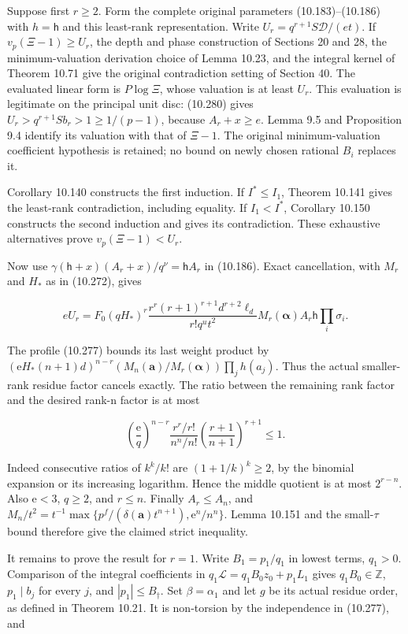 \documentclass[
  11pt,
  a4paper,
]{article}
\begin{document}
Suppose first \(r\ge2\). Form the complete original parameters
(10.183)--(10.186) with \(h=\mathsf h\) and this least-rank
representation. Write \(U_r=q^{r+1}S\mathcal D/(et)\). If
\(v_p(\Xi-1)\ge U_r\), the depth and phase construction of Sections 20
and 28, the minimum-valuation derivation choice of Lemma 10.23, and the
integral kernel of Theorem 10.71 give the original contradiction setting
of Section 40. The evaluated linear form is \(P\log\Xi\), whose
valuation is at least \(U_r\). This evaluation is legitimate on the
principal unit disc: (10.280) gives \(U_r>q^{r+1}Sb_r>1\ge1/(p-1)\),
because \(A_r+x\ge e\). Lemma 9.5 and Proposition 9.4 identify its
valuation with that of \(\Xi-1\). The original minimum-valuation
coefficient hypothesis is retained; no bound on newly chosen rational
\(B_i\) replaces it.

Corollary 10.140 constructs the first induction. If \(I^*\le I_1\),
Theorem 10.141 gives the least-rank contradiction, including equality.
If \(I_1<I^*\), Corollary 10.150 constructs the second induction and
gives its contradiction. These exhaustive alternatives prove
\(v_p(\Xi-1)<U_r\).

Now use \(\gamma(\mathsf h+x)(A_r+x)/q^\nu
=\mathsf hA_r\) in (10.186). Exact cancellation, with \(M_r\) and
\(H_*\) as in (10.272), gives

\[
eU_r=F_0(qH_*)^r
\frac{r^r(r+1)^{r+1}d^{r+2}\ell_d}{r!q^ut^2}
M_r(\boldsymbol\alpha)A_r\mathsf h\prod_i\sigma_i.
\tag{10.452}
\]

The profile (10.277) bounds its last weight product by
\((\mathrm eH_*(n+1)d)^{n-r}
(M_n(\boldsymbol a)/M_r(\boldsymbol\alpha))\prod_jh(a_j)\). Thus the
actual smaller-rank residue factor cancels exactly. The ratio between
the remaining rank factor and the desired rank-n factor is at most

\[
\left(\frac{\mathrm e}{q}\right)^{n-r}
\frac{r^r/r!}{n^n/n!}
\left(\frac{r+1}{n+1}\right)^{r+1}\le1.
\tag{10.453}
\]

Indeed consecutive ratios of \(k^k/k!\) are \((1+1/k)^k\ge2\), by the
binomial expansion or its increasing logarithm. Hence the middle
quotient is at most \(2^{r-n}\). Also \(\mathrm e<3\), \(q\ge2\), and
\(r\le n\). Finally \(A_r\le A_n\), and
\(M_n/t^2=t^{-1}\max\{p^f/(\delta(\boldsymbol a)t^{n+1}),
\mathrm e^n/n^n\}\). Lemma 10.151 and the small-\(\tau\) bound therefore
give the claimed strict inequality.

It remains to prove the result for \(r=1\). Write \(B_1=p_1/q_1\) in
lowest terms, \(q_1>0\). Comparison of the integral coefficients in
\(q_1\mathcal L=q_1B_0z_0+p_1L_1\) gives \(q_1B_0\in\mathbb Z\),
\(p_1\mid b_j\) for every \(j\), and \(|p_1|\le B_\dagger\). Set
\(\beta=\alpha_1\) and let \(g\) be its actual residue order, as defined
in Theorem 10.21. It is non-torsion by the independence in (10.277), and
\end{document}
